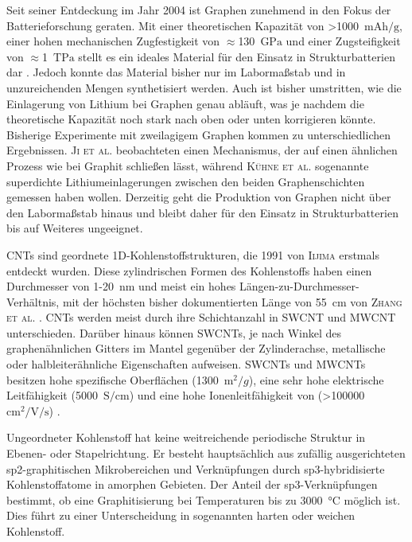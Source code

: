 Seit seiner Entdeckung im Jahr 2004 \cite{Novoselov2004} ist Graphen zunehmend in den Fokus der Batterieforschung geraten. Mit einer theoretischen Kapazität von >1000~$\si{\mA \hour \per \g}$, einer hohen mechanischen Zugfestigkeit von $\approx$130~$\si{\GPa}$ und einer Zugsteifigkeit von $\approx$1~$\si{\tera \Pa}$ stellt es ein ideales Material für den Einsatz in Strukturbatterien dar \cite{Novoselov2012}. Jedoch konnte das Material bisher nur im Labormaßstab und in unzureichenden Mengen synthetisiert werden. Auch ist bisher umstritten, wie die Einlagerung von Lithium bei Graphen genau abläuft, was je nachdem die theoretische Kapazität noch stark nach oben oder unten korrigieren könnte. Bisherige Experimente mit zweilagigem Graphen kommen zu unterschiedlichen Ergebnissen. \textsc{Ji et al.} beobachteten einen Mechanismus, der auf einen ähnlichen Prozess wie bei Graphit schließen lässt, während \textsc{Kühne et al.} sogenannte superdichte Lithiumeinlagerungen zwischen den beiden Graphenschichten gemessen haben wollen. Derzeitig geht die Produktion von Graphen nicht über den Labormaßstab hinaus und bleibt daher für den Einsatz in Strukturbatterien bis auf Weiteres ungeeignet.

CNTs sind geordnete 1D-Kohlenstoffstrukturen, die 1991 von \textsc{Iijima} \cite{Iijima1991} erstmals entdeckt wurden. Diese zylindrischen Formen des Kohlenstoffs haben einen Durchmesser von 1-20~$\si{\nano\metre}$ und meist ein hohes Längen-zu-Durchmesser-Verhältnis, mit der höchsten bisher dokumentierten Länge von 55~$\si{\centi\metre}$ von \textsc{Zhang et al.} \cite{Zhang2013}. CNTs werden meist durch ihre Schichtanzahl in SWCNT und MWCNT unterschieden. Darüber hinaus können SWCNTs, je nach Winkel des graphenähnlichen Gitters im Mantel gegenüber der Zylinderachse, metallische oder halbleiterähnliche Eigenschaften aufweisen. 
SWCNTs und MWCNTs besitzen hohe spezifische Oberflächen (1300~$\si{\m^2\per g}$), eine sehr hohe elektrische Leitfähigkeit (5000~$\si{\siemens \per \cm}$) und eine hohe Ionenleitfähigkeit von (>100000~$\si{\cm \squared \per \V \per \s}$) \cite{Xu2011,Uetani2014,Charlier2007}.

Ungeordneter Kohlenstoff hat keine weitreichende periodische Struktur in Ebenen- oder Stapelrichtung. Er besteht hauptsächlich aus zufällig ausgerichteten sp2-graphitischen Mikrobereichen und Verknüpfungen durch sp3-hybridisierte Kohlenstoffatome in amorphen Gebieten. Der Anteil der sp3-Verknüpfungen bestimmt, ob eine Graphitisierung bei Temperaturen bis zu 3000~$\si{\degreeCelsius}$ möglich ist. Dies führt zu einer Unterscheidung in sogenannten harten oder weichen Kohlenstoff.

